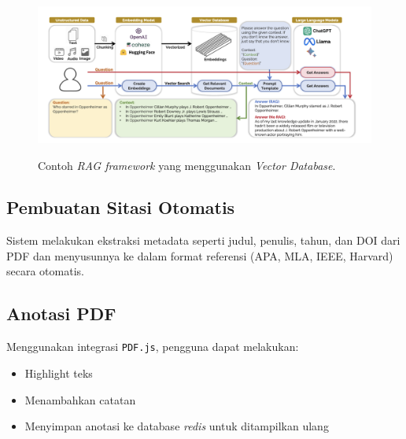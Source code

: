 \begin{figure}[htbp]
  \centering
  \includegraphics[width=0.85\linewidth]{images/bab-3/embeddings.png}
  \caption{Contoh \emph{RAG framework} yang menggunakan \emph{Vector Database}.}\label{fig:RAG-Framework}\citep{Jing}
\end{figure}

\subsection{Pembuatan Sitasi Otomatis}
Sistem melakukan ekstraksi metadata seperti judul, penulis, tahun, dan DOI dari PDF dan menyusunnya ke dalam format referensi (APA, MLA, IEEE, Harvard) secara otomatis.



\subsection{Anotasi PDF}
Menggunakan integrasi \texttt{PDF.js}, pengguna dapat melakukan:
\begin{itemize}
  \item Highlight teks
  \item Menambahkan catatan
  \item Menyimpan anotasi ke database \textit{redis} untuk ditampilkan ulang
\end{itemize}

